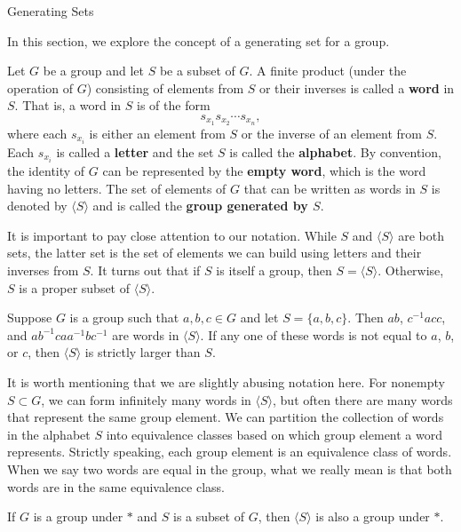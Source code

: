 \begin{section}{Generating Sets}


In this section, we explore the concept of a generating set for a group.

\begin{definition}
Let $G$ be a group and let $S$ be a subset of $G$. A finite product (under the operation of $G$) consisting of elements from $S$ or their inverses is called a \textbf{word} in $S$. That is, a word in $S$ is of the form
\[
s_{x_1}s_{x_2}\cdots s_{x_n},
\]
where each $s_{x_i}$ is either an element from $S$ or the inverse of an element from $S$. Each $s_{x_i}$ is called a \textbf{letter} and the set $S$ is called the \textbf{alphabet}. By convention, the identity of $G$ can be represented by the \textbf{empty word}, which is the word having no letters. The set of elements of $G$ that can be written as words in $S$ is denoted by $\langle S\rangle$ and is called the \textbf{group generated by $S$}.
\end{definition}

It is important to pay close attention to our notation. While $S$ and $\langle S\rangle$ are both sets, the latter set is the set of elements we can build using letters and their inverses from $S$. It turns out that if $S$ is itself a group, then $S=\langle S\rangle$. Otherwise, $S$ is a proper subset of $\langle S\rangle$. 

\begin{example}
Suppose $G$ is a group such that $a,b,c\in G$ and let $S=\{a,b,c\}$. Then $ab$, $c^{-1}acc$, and $ab^{-1}caa^{-1}bc^{-1}$ are words in $\langle S\rangle$. If any one of these words is not equal to $a$, $b$, or $c$, then $\langle S\rangle$ is strictly larger than $S$.
\end{example}

It is worth mentioning that we are slightly abusing notation here. For nonempty $S\subset G$, we can form infinitely many words in $\langle S\rangle$, but often there are many words that represent the same group element. We can partition the collection of words in the alphabet $S$ into equivalence classes based on which group element a word represents. Strictly speaking, each group element is an equivalence class of words. When we say two words are equal in the group, what we really mean is that both words are in the same equivalence class.

\begin{theorem}\label{thm:subgroup_generated_by_S}
If $G$ is a group under $*$ and $S$ is a subset of $G$, then $\langle S\rangle$ is also a group under $*$.
\end{theorem}


\end{section}

